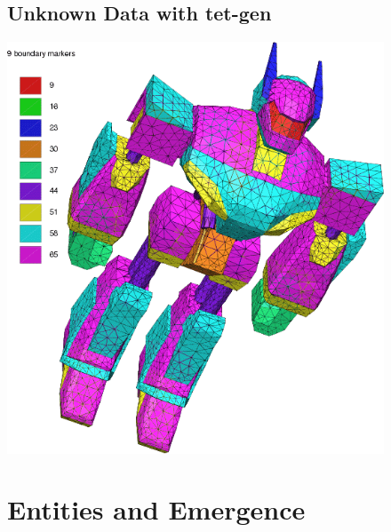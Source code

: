 \documentclass[11pt]{article}
\begin{document}
\begin{itemize}
\begin{figure}[htp]
\subsection{Unknown Data with tet-gen}
\includegraphics[scale=0.3]{image/unknow-robot.png}
\end{figure}

\begin{itemize}  
\begin{figure}[htp]
\section{Entities and Emergence}



\end{figure}
\end{itemize}
\end{itemize}
\end{document}

